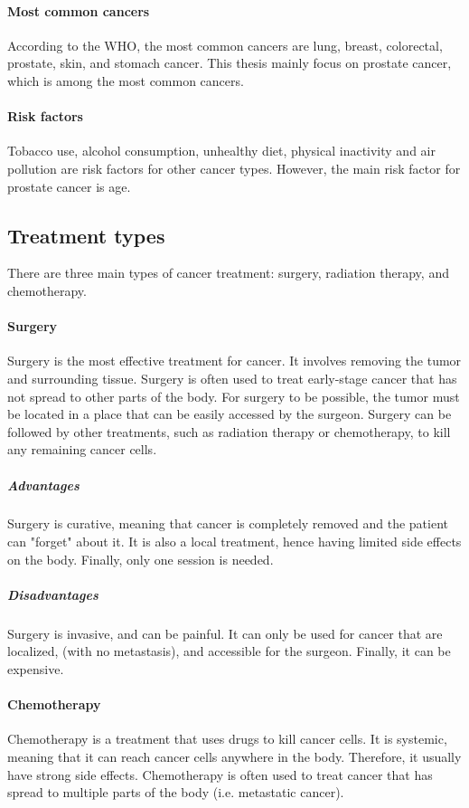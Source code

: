 \paragraph{Most common cancers}
According to the WHO, the most common cancers are lung, breast, colorectal, prostate, skin, and stomach cancer.
This thesis mainly focus on prostate cancer, which is among the most common cancers.

\paragraph{Risk factors}
Tobacco use, alcohol consumption, unhealthy diet, physical inactivity and air pollution are risk factors for other cancer types.
However, the main risk factor for prostate cancer is age.

\subsection{Treatment types}

There are three main types of cancer treatment: surgery, radiation therapy, and chemotherapy.


\paragraph{Surgery}
Surgery is the most effective treatment for cancer.
It involves removing the tumor and surrounding tissue.
Surgery is often used to treat early-stage cancer that has not spread to other parts of the body.
For surgery to be possible, the tumor must be located in a place that can be easily accessed by the surgeon.
Surgery can be followed by other treatments, such as radiation therapy or chemotherapy, to kill any remaining cancer cells.

\subparagraph{Advantages}
Surgery is curative, meaning that cancer is completely removed and the patient can "forget" about it.
It is also a local treatment, hence having limited side effects on the body.
Finally, only one session is needed.

\subparagraph{Disadvantages}
Surgery is invasive, and can be painful.
It can only be used for cancer that are localized, (with no metastasis), and accessible for the surgeon.
Finally, it can be expensive.

\paragraph{Chemotherapy}
Chemotherapy is a treatment that uses drugs to kill cancer cells.
It is systemic, meaning that it can reach cancer cells anywhere in the body.
Therefore, it usually have strong side effects.
Chemotherapy is often used to treat cancer that has spread to multiple parts of the body (i.e. metastatic cancer).


